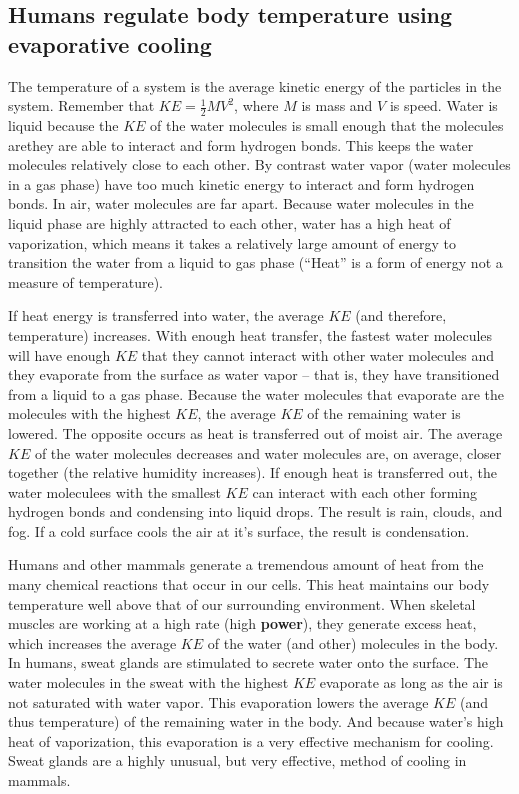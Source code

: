 \documentclass[]{book}
\begin{document}
\subsection{Humans regulate body temperature using evaporative
cooling}\label{humans-regulate-body-temperature-using-evaporative-cooling}

The temperature of a system is the average kinetic energy of the
particles in the system. Remember that \(KE = \frac{1}{2}MV^2\), where
\(M\) is mass and \(V\) is speed. Water is liquid because the \(KE\) of
the water molecules is small enough that the molecules arethey are able
to interact and form hydrogen bonds. This keeps the water molecules
relatively close to each other. By contrast water vapor (water molecules
in a gas phase) have too much kinetic energy to interact and form
hydrogen bonds. In air, water molecules are far apart. Because water
molecules in the liquid phase are highly attracted to each other, water
has a high heat of vaporization, which means it takes a relatively large
amount of energy to transition the water from a liquid to gas phase
(``Heat'' is a form of energy not a measure of temperature).

If heat energy is transferred into water, the average \(KE\) (and
therefore, temperature) increases. With enough heat transfer, the
fastest water molecules will have enough \(KE\) that they cannot
interact with other water molecules and they evaporate from the surface
as water vapor -- that is, they have transitioned from a liquid to a gas
phase. Because the water molecules that evaporate are the molecules with
the highest \(KE\), the average \(KE\) of the remaining water is
lowered. The opposite occurs as heat is transferred out of moist air.
The average \(KE\) of the water molecules decreases and water molecules
are, on average, closer together (the relative humidity increases). If
enough heat is transferred out, the water moleculees with the smallest
\(KE\) can interact with each other forming hydrogen bonds and
condensing into liquid drops. The result is rain, clouds, and fog. If a
cold surface cools the air at it's surface, the result is condensation.

Humans and other mammals generate a tremendous amount of heat from the
many chemical reactions that occur in our cells. This heat maintains our
body temperature well above that of our surrounding environment. When
skeletal muscles are working at a high rate (high \textbf{power}), they
generate excess heat, which increases the average \(KE\) of the water
(and other) molecules in the body. In humans, sweat glands are
stimulated to secrete water onto the surface. The water molecules in the
sweat with the highest \(KE\) evaporate as long as the air is not
saturated with water vapor. This evaporation lowers the average \(KE\)
(and thus temperature) of the remaining water in the body. And because
water's high heat of vaporization, this evaporation is a very effective
mechanism for cooling. Sweat glands are a highly unusual, but very
effective, method of cooling in mammals.
\end{document}
